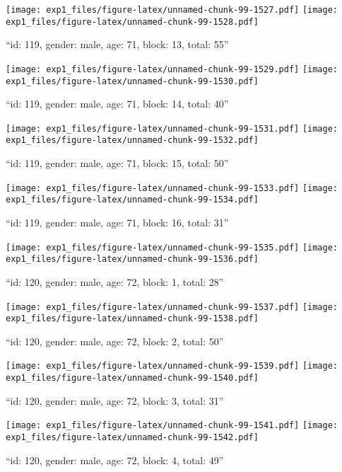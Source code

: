 \documentclass[,]{article}
\begin{document}
\texttt{[image: exp1\_files/figure-latex/unnamed-chunk-99-1527.pdf]}
\texttt{[image: exp1\_files/figure-latex/unnamed-chunk-99-1528.pdf]}

\newpage
[1] 

``id: 119, gender: male, age: 71, block: 13, total: 55''

\texttt{[image: exp1\_files/figure-latex/unnamed-chunk-99-1529.pdf]}
\texttt{[image: exp1\_files/figure-latex/unnamed-chunk-99-1530.pdf]}

\newpage
[1] 

``id: 119, gender: male, age: 71, block: 14, total: 40''

\texttt{[image: exp1\_files/figure-latex/unnamed-chunk-99-1531.pdf]}
\texttt{[image: exp1\_files/figure-latex/unnamed-chunk-99-1532.pdf]}

\newpage
[1] 

``id: 119, gender: male, age: 71, block: 15, total: 50''

\texttt{[image: exp1\_files/figure-latex/unnamed-chunk-99-1533.pdf]}
\texttt{[image: exp1\_files/figure-latex/unnamed-chunk-99-1534.pdf]}

\newpage
[1] 

``id: 119, gender: male, age: 71, block: 16, total: 31''

\texttt{[image: exp1\_files/figure-latex/unnamed-chunk-99-1535.pdf]}
\texttt{[image: exp1\_files/figure-latex/unnamed-chunk-99-1536.pdf]}

\newpage
[1] 

``id: 120, gender: male, age: 72, block: 1, total: 28''

\texttt{[image: exp1\_files/figure-latex/unnamed-chunk-99-1537.pdf]}
\texttt{[image: exp1\_files/figure-latex/unnamed-chunk-99-1538.pdf]}

\newpage
[1] 

``id: 120, gender: male, age: 72, block: 2, total: 50''

\texttt{[image: exp1\_files/figure-latex/unnamed-chunk-99-1539.pdf]}
\texttt{[image: exp1\_files/figure-latex/unnamed-chunk-99-1540.pdf]}

\newpage
[1] 

``id: 120, gender: male, age: 72, block: 3, total: 31''

\texttt{[image: exp1\_files/figure-latex/unnamed-chunk-99-1541.pdf]}
\texttt{[image: exp1\_files/figure-latex/unnamed-chunk-99-1542.pdf]}

\newpage
[1] 

``id: 120, gender: male, age: 72, block: 4, total: 49''
\end{document}
